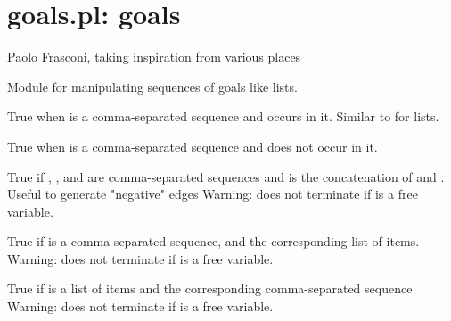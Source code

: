 


\section{goals.pl: goals}

\label{sec:goals}

\begin{tags}
Paolo Frasconi, taking inspiration from various places
\end{tags}

Module for manipulating sequences of goals like lists.\vspace{0.7cm}

\begin{description}
True when  is a comma-separated sequence and  occurs in
it. Similar to  for lists.

True when  is a comma-separated sequence and  does not occur in
it.

True if , , and  are comma-separated sequences and  is the
concatenation of  and . Useful to generate "negative" edges
Warning: does not terminate if  is a free variable.

True if  is a comma-separated sequence, and  the corresponding
list of items.
Warning: does not terminate if  is a free variable.

True if  is a list of items and  the corresponding comma-separated
sequence Warning: does not terminate if  is a free variable.
\end{description}

